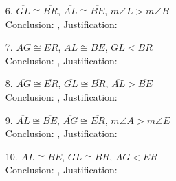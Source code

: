 \def\figdir{/storage/emulated/0/Documents/documents/latex/1920/Grade-8/3rd/inequalities-in-two-triangles/f}





\begin{enumerate}[label = \arabic*. ]
\item[6. ] $\overline{GL} \cong \overline{BR}$, $\overline{AL} \cong \overline{BE}$, $m\angle{L} > m\angle{B}$ \\
Conclusion: \blank,  Justification: \blank 
\item[7. ] $\overline{AG} \cong \overline{ER}$, $\overline{AL} \cong \overline{BE}$, $\overline{GL} < \overline{BR} $ \\
Conclusion: \blank,  Justification: \blank 
\item[8. ] $\overline{AG} \cong \overline{ER}$, $\overline{GL} \cong \overline{BR}$, $\overline{AL} > \overline{BE} $ \\
Conclusion: \blank,  Justification: \blank 
\item[9. ] $\overline{AL} \cong \overline{BE}$, $\overline{AG} \cong \overline{ER}$, $m\angle{A} > m\angle{E}$ \\
Conclusion: \blank,  Justification: \blank 
\item[10. ] $\overline{AL} \cong \overline{BE}$, $\overline{GL} \cong \overline{BR}$, $\overline{AG} < \overline{ER} $ \\
Conclusion: \blank,  Justification: \blank 
\end{enumerate}  